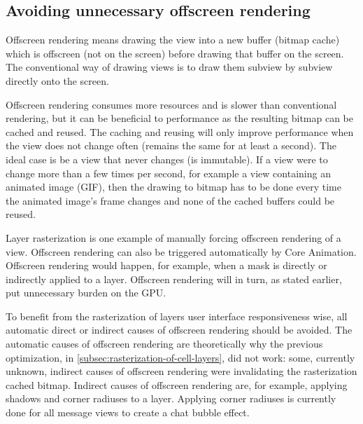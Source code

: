 \documentclass[a4paper,12pt]{article}
\begin{document}
\subsection{Avoiding unnecessary offscreen rendering}
\label{subsec:avoiding-unnecessary-offscreen-rendering}
Offscreen rendering means drawing the view into a new buffer (bitmap cache) which is offscreen (not on the screen) before drawing that buffer on the screen. The conventional way of drawing views is to draw them subview by subview directly onto the screen.\cite{MovingPixelsOntoTheScreen}

Offscreen rendering consumes more resources and is slower than conventional rendering, but it can be beneficial to performance as the resulting bitmap can be cached and reused. The caching and reusing will only improve performance when the view does not change often (remains the same for at least a second). The ideal case is be a view that never changes (is immutable). If a view were to change more than a few times per second, for example a view containing an animated image (GIF), then the drawing to bitmap has to be done every time the animated image's frame changes and none of the cached buffers could be reused.\cite{MovingPixelsOntoTheScreen}

Layer rasterization is one example of manually forcing offscreen rendering of a view. Offscreen rendering can also be triggered automatically by Core Animation. Offscreen rendering would happen, for example, when a mask is directly or indirectly applied to a layer. Offscreen rendering will in turn, as stated earlier, put unnecessary burden on the GPU.\cite{MovingPixelsOntoTheScreen}

To benefit from the rasterization of layers user interface responsiveness wise, all automatic direct or indirect causes of offscreen rendering should be avoided. The automatic causes of offscreen rendering are theoretically why the previous optimization, in \autoref{subsec:rasterization-of-cell-layers}, did not work: some, currently unknown, indirect causes of offscreen rendering were invalidating the rasterization cached bitmap. Indirect causes of offscreen rendering are, for example, applying shadows and corner radiuses to a layer.\cite{MovingPixelsOntoTheScreen} Applying corner radiuses is currently done for all message views to create a chat bubble effect.
\end{document}
